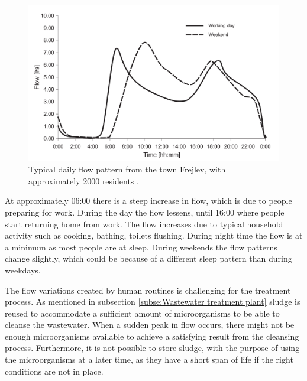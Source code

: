 \begin{figure}[H]
\centering
\includegraphics[width=.6\textwidth]{report/introduction/pictures/poopflow.png}
\caption{Typical daily flow pattern from the town Frejlev, with approximately 2000 residents \cite{schlutter1999numerical}.}
\label{fig:input_to_wwtp}%
\end{figure} 

At approximately 06:00 there is a steep increase in flow, which is due to people preparing for work. During the day the flow lessens, until 16:00 where people start returning home from work. The flow increases due to typical household activity such as cooking, bathing, toilets flushing. During night time the flow is at a minimum as most people are at sleep. During weekends the flow patterns change slightly, which could be because of a different sleep pattern than during weekdays.  %

The flow variations created by human routines is challenging for the treatment process. As mentioned in subsection \ref{subse:Wastewater treatment plant} sludge is reused to accommodate a sufficient amount of microorganisms to be able to cleanse the wastewater. When a sudden peak in flow occurs, there might not be enough microorganisms available to achieve a satisfying result from the cleansing process. Furthermore, it is not possible to store sludge, with the purpose of using the microorganisms at a later time, as they have a short span of life if the right conditions are not in place.

